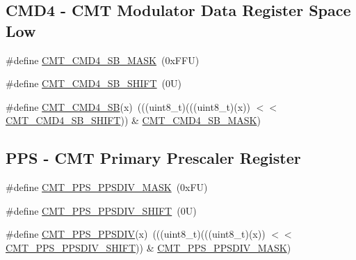 \subsection*{C\+M\+D4 -\/ C\+MT Modulator Data Register Space Low}
\begin{DoxyCompactItemize}
\item 
\#define \mbox{\hyperlink{group___c_m_t___register___masks_ga634397e39fb458afba9c0cfefdfc36d8}{C\+M\+T\+\_\+\+C\+M\+D4\+\_\+\+S\+B\+\_\+\+M\+A\+SK}}~(0x\+F\+F\+U)
\item 
\#define \mbox{\hyperlink{group___c_m_t___register___masks_gac4d14f573bc993ac68f7cc9242fbe888}{C\+M\+T\+\_\+\+C\+M\+D4\+\_\+\+S\+B\+\_\+\+S\+H\+I\+FT}}~(0\+U)
\item 
\#define \mbox{\hyperlink{group___c_m_t___register___masks_gab29afd8c13712224b175b9ea866463ba}{C\+M\+T\+\_\+\+C\+M\+D4\+\_\+\+SB}}(x)~(((uint8\+\_\+t)(((uint8\+\_\+t)(x)) $<$$<$ \mbox{\hyperlink{group___c_m_t___register___masks_gac4d14f573bc993ac68f7cc9242fbe888}{C\+M\+T\+\_\+\+C\+M\+D4\+\_\+\+S\+B\+\_\+\+S\+H\+I\+FT}})) \& \mbox{\hyperlink{group___c_m_t___register___masks_ga634397e39fb458afba9c0cfefdfc36d8}{C\+M\+T\+\_\+\+C\+M\+D4\+\_\+\+S\+B\+\_\+\+M\+A\+SK}})
\end{DoxyCompactItemize}
\subsection*{P\+PS -\/ C\+MT Primary Prescaler Register}
\begin{DoxyCompactItemize}
\item 
\#define \mbox{\hyperlink{group___c_m_t___register___masks_ga52042920cc25a46d0e050801a105a629}{C\+M\+T\+\_\+\+P\+P\+S\+\_\+\+P\+P\+S\+D\+I\+V\+\_\+\+M\+A\+SK}}~(0x\+F\+U)
\item 
\#define \mbox{\hyperlink{group___c_m_t___register___masks_gaaafd6c1e8178ed7cd283f3ffcfaed535}{C\+M\+T\+\_\+\+P\+P\+S\+\_\+\+P\+P\+S\+D\+I\+V\+\_\+\+S\+H\+I\+FT}}~(0\+U)
\item 
\#define \mbox{\hyperlink{group___c_m_t___register___masks_ga47d0c8720fa9b402dbacf8e53eec5134}{C\+M\+T\+\_\+\+P\+P\+S\+\_\+\+P\+P\+S\+D\+IV}}(x)~(((uint8\+\_\+t)(((uint8\+\_\+t)(x)) $<$$<$ \mbox{\hyperlink{group___c_m_t___register___masks_gaaafd6c1e8178ed7cd283f3ffcfaed535}{C\+M\+T\+\_\+\+P\+P\+S\+\_\+\+P\+P\+S\+D\+I\+V\+\_\+\+S\+H\+I\+FT}})) \& \mbox{\hyperlink{group___c_m_t___register___masks_ga52042920cc25a46d0e050801a105a629}{C\+M\+T\+\_\+\+P\+P\+S\+\_\+\+P\+P\+S\+D\+I\+V\+\_\+\+M\+A\+SK}})
\end{DoxyCompactItemize}
